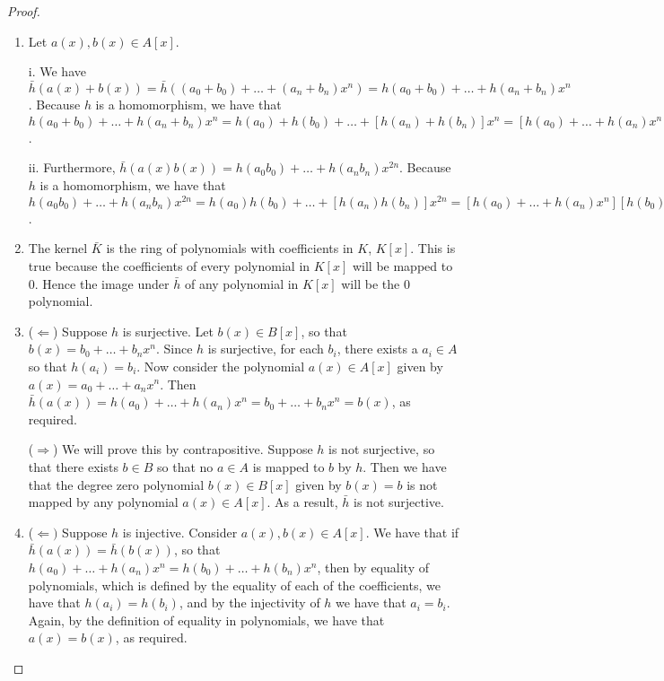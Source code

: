 \begin{proof}
\begin{enumerate}
    \item Let $a(x),b(x)\in A[x]$.

    i. We have $\bar{h}(a(x)+b(x))= \bar{h}((a_0+b_0)+\dots+(a_n+b_n)x^n)= h(a_0+b_0)+\dots+h(a_n+b_n)x^n$. Because $h$ is a homomorphism, we have that $h(a_0+b_0)+\dots+h(a_n+b_n)x^n= h(a_0)+h(b_0)+\dots+[h(a_n)+h(b_n)]x^n= [h(a_0)+\dots+h(a_n)x^n]+[h(b_0)+\dots+h(b_n)x^n]= \bar{h}(a(x))+\bar{h}(b(x))$.

    ii. Furthermore, $\bar{h}(a(x)b(x))= h(a_0b_0)+\dots+h(a_nb_n)x^{2n}$. Because $h$ is a homomorphism, we have that $h(a_0b_0)+\dots+h(a_nb_n)x^{2n}= h(a_0)h(b_0)+\dots+[h(a_n)h(b_n)]x^{2n}= [h(a_0)+\dots+h(a_n)x^n][h(b_0)+\dots+h(b_n)x^n]= \bar{h}(a(x))\bar{h}(b(x))$.
    \item The kernel $\bar{K}$ is the ring of polynomials with coefficients in $K$, $K[x]$. This is true because the coefficients of every polynomial in $K[x]$ will be mapped to $0$. Hence the image under $\bar{h}$ of any polynomial in $K[x]$ will be the $0$ polynomial.
    \item ($\Leftarrow$) Suppose $h$ is surjective. Let $b(x)\in B[x]$, so that $b(x)=b_0+\dots+b_nx^n$. Since $h$ is surjective, for each $b_i$, there exists a $a_i\in A$ so that $h(a_i)=b_i$. Now consider the polynomial $a(x)\in A[x]$ given by $a(x)=a_0+\dots+a_nx^n$. Then $\bar{h}(a(x))=h(a_0)+\dots+h(a_n)x^n=b_0+\dots+b_nx^n=b(x)$, as required.

    ($\Rightarrow$) We will prove this by contrapositive. Suppose $h$ is not surjective, so that there exists $b\in B$ so that no $a\in A$ is mapped to $b$ by $h$. Then we have that the degree zero polynomial $b(x)\in B[x]$ given by $b(x)=b$ is not mapped by any polynomial $a(x)\in A[x]$. As a result, $\bar{h}$ is not surjective.
    \item ($\Leftarrow)$ Suppose $h$ is injective. Consider $a(x),b(x)\in A[x]$. We have that if $\bar{h}(a(x))=\bar{h}(b(x))$, so that $h(a_0)+\dots+h(a_n)x^n= h(b_0)+\dots+h(b_n)x^n$, then by equality of polynomials, which is defined by the equality of each of the coefficients, we have that $h(a_i)=h(b_i)$, and by the injectivity of $h$ we have that $a_i=b_i$. Again, by the definition of equality in polynomials, we have that $a(x)=b(x)$, as required.


\end{enumerate}
\end{proof}
